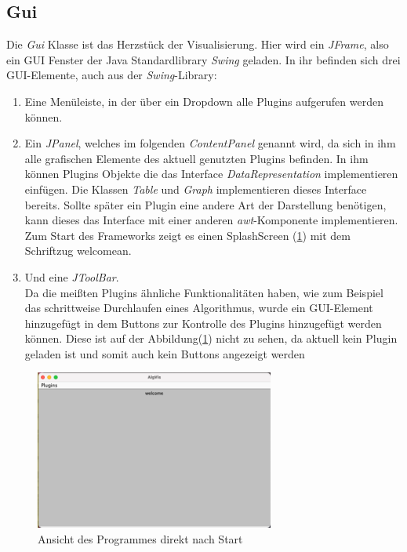 \subsection{Gui} 
Die \textit{Gui} Klasse ist das Herzstück der Visualisierung. Hier wird ein \textit{JFrame},
also ein GUI Fenster der Java Standardlibrary \textit{Swing} geladen. In ihr befinden sich
drei GUI-Elemente, auch aus der \textit{Swing}-Library:
\begin{enumerate}
  \item Eine Menüleiste, in der über ein Dropdown alle Plugins aufgerufen werden können.
  \item Ein \textit{JPanel}, welches im folgenden \textit{ContentPanel} genannt wird, 
    da sich in ihm alle grafischen Elemente des aktuell genutzten Plugins befinden.
    In ihm können Plugins Objekte die das Interface
    \textit{DataRepresentation} implementieren einfügen.
    Die Klassen \textit{Table} und \textit{Graph} implementieren dieses Interface bereits. 
    Sollte später ein Plugin eine andere Art der Darstellung benötigen,
    kann dieses das Interface mit einer anderen \textit{awt}-Komponente implementieren.
    Zum Start des Frameworks zeigt es einen SplashScreen (\cref{fig:screenshot_splashScreen}) mit dem Schriftzug \glqq welcome\grqq an.
  \item Und eine \textit{JToolBar}.\\
    Da die meißten Plugins ähnliche Funktionalitäten haben, wie zum Beispiel
    das schrittweise Durchlaufen eines Algorithmus, 
    wurde ein GUI-Element hinzugefügt in dem Buttons zur Kontrolle des Plugins
    hinzugefügt werden können. Diese ist auf der Abbildung(\cref{fig:screenshot_splashScreen})
    nicht zu sehen, da aktuell kein Plugin geladen ist und somit auch kein Buttons angezeigt werden
\end{enumerate}


\newpage
\begin{figure}[h!]
  \centering
  \includegraphics[width=0.7\textwidth]{fig/Screenshot_SplashScreen.png}
  \caption{Ansicht des Programmes direkt nach Start}
  \label{fig:screenshot_splashScreen}
\end{figure}



